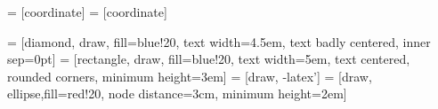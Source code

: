\usepackage{tikz}
\usetikzlibrary{shapes}
\usetikzlibrary{arrows}
\usetikzlibrary{fit}
\usetikzlibrary{backgrounds}

 = [coordinate]
 = [coordinate]


 = [diamond, draw, fill=blue!20, 
    text width=4.5em, text badly centered, inner sep=0pt]
 = [rectangle, draw, fill=blue!20, 
    text width=5em, text centered, rounded corners, minimum height=3em]
 = [draw, -latex']
 = [draw, ellipse,fill=red!20, node distance=3cm,
    minimum height=2em]